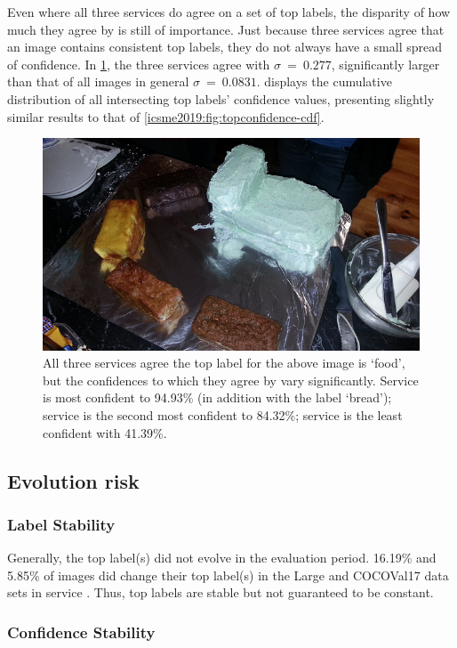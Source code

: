 Even where all three services do agree on a set of top labels, the disparity of how much they agree by is still of importance. Just because three services agree that an image contains consistent top labels, they do not always have a small spread of confidence. In \cref{icsme2019:fig:sample-images:cake}, the three services agree with $\sigma~=~0.277$, significantly larger than that of all images in general $\sigma~=~0.0831$.  displays the cumulative distribution of all intersecting top labels' confidence values, presenting slightly similar results to that of \cref{icsme2019:fig:topconfidence-cdf}.

\begin{figure}
  \centering
  \includegraphics[width=0.55\linewidth]{000000095707}    
  \caption[Agreement of labels between multiple computer vision services do not share similar confidences]{All three services agree the top label for the above image is `food', but the confidences to which they agree by vary significantly. Service \awsapi{} is most confident to 94.93\% (in addition with the label `bread'); service \googleapi{} is the second most confident to 84.32\%; service \azureapi{} is the least confident with 41.39\%.}
  \label{icsme2019:fig:sample-images:cake}
\end{figure}

\subsection{Evolution risk}

\subsubsection{Label Stability}

Generally, the top label(s) did not evolve in the evaluation period. 16.19\% and 5.85\% of images did change their top label(s) in the Large and COCOVal17 data sets in service \googleapi{}. Thus, top labels are stable but not guaranteed to be constant.

\subsubsection{Confidence Stability}

